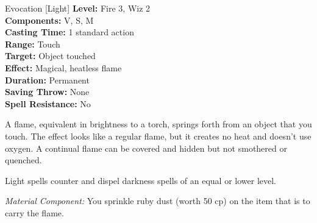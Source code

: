 {Evocation [Light]}
{
	\textbf{Level:}
	Fire 3, Wiz 2\\
	\textbf{Components:}
	V, S, M\\
	\textbf{Casting Time:}
	1 standard action\\
	\textbf{Range:}
	Touch\\
	\textbf{Target:}
	Object touched\\
	\textbf{Effect:}
	Magical, heatless flame\\
	\textbf{Duration:}
	Permanent\\
	\textbf{Saving Throw:}
	None\\
	\textbf{Spell Resistance:}
	No\\
}
{
	A flame, equivalent in brightness to a torch, springs forth from an object that you touch. The effect looks like a regular flame, but it creates no heat and doesn't use oxygen. A continual flame can be covered and hidden but not smothered or quenched.

	Light spells counter and dispel darkness spells of an equal or lower level.

	\textit{Material Component:}
	You sprinkle ruby dust (worth 50 cp) on the item that is to carry the flame.

}
